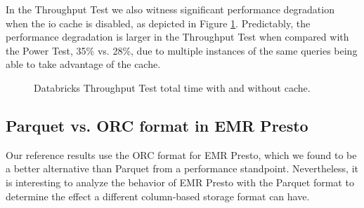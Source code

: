 In the Throughput Test we also witness significant performance degradation when the io cache is disabled, as depicted in Figure \ref{fig:additionalResultsDatabricksNoCacheTputTest}. Predictably, the performance degradation is larger in the Throughput Test when compared with the Power Test, 35\% vs. 28\%, due to multiple instances of the same queries being able to take advantage of the cache.

\begin{figure}
   \begin{center}
   \end{center}
   \caption{Databricks Throughput Test total time with and without cache.}
   \label{fig:additionalResultsDatabricksNoCacheTputTest}
\end{figure}

\subsection{Parquet vs. ORC format in EMR Presto}\label{additionalExperimentsParquetVsORCPresto}

Our reference results use the ORC format for EMR Presto, which we found to be a better alternative than Parquet from a performance standpoint. Nevertheless, it is interesting to analyze the behavior of EMR Presto with the Parquet format to determine the effect a different column-based storage format can have.

